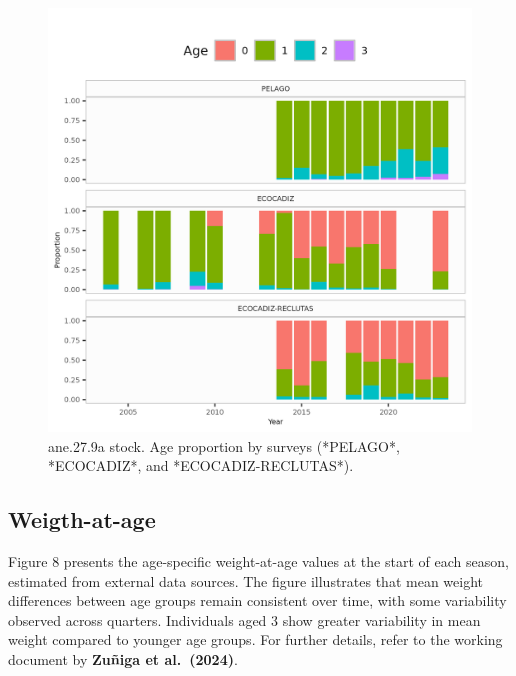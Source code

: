 \documentclass[
]{article}
\begin{document}
\begin{figure}[H]

{\centering \includegraphics[width=0.95\linewidth]{report/run/S1.0_4FLEETS/fig_agecomp_by_quartersSurveys} 

}

\caption{ane.27.9a stock. Age proportion by surveys  (*PELAGO*, *ECOCADIZ*, and *ECOCADIZ-RECLUTAS*).}\label{fig:unnamed-chunk-8}
\end{figure}

\hypertarget{weigth-at-age}{%
\subsection{Weigth-at-age}\label{weigth-at-age}}

Figure 8 presents the age-specific weight-at-age values at the start of
each season, estimated from external data sources. The figure
illustrates that mean weight differences between age groups remain
consistent over time, with some variability observed across quarters.
Individuals aged 3 show greater variability in mean weight compared to
younger age groups. For further details, refer to the working document
by \textbf{Zuñiga et al.~(2024)}.
\end{document}
